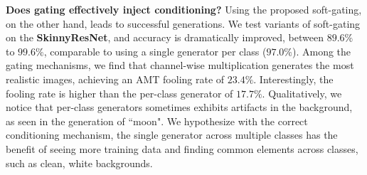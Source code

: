 
\noindent \textbf{Does gating effectively inject conditioning?} Using the proposed soft-gating, on the other hand, leads to successful generations. We test variants of soft-gating on the \textbf{SkinnyResNet}, and accuracy is dramatically improved, between $89.6\%$ to $99.6\%$, comparable to using a single generator per class ($97.0\%$).
Among the gating mechanisms, we find that channel-wise multiplication
generates the most realistic images, achieving an AMT fooling rate of $23.4\%$. Interestingly, the fooling rate is higher than the per-class generator of $17.7\%$. Qualitatively, we notice that per-class generators sometimes exhibits artifacts in the background, as seen in the generation of ``moon". We hypothesize with the correct conditioning mechanism, the single generator across multiple classes has the benefit of seeing more training data and finding common elements across classes, such as clean, white backgrounds.



